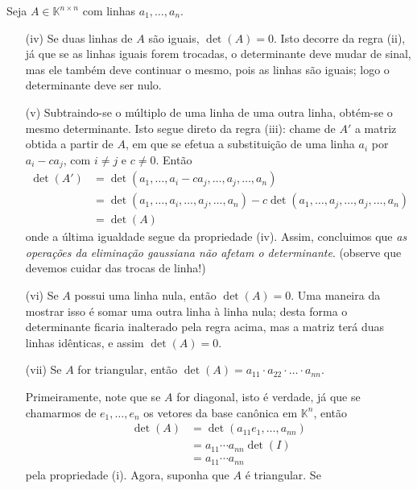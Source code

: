 Seja $A \in {\mathbb{K}}^{n\times n}$ com linhas $a_1,\ldots,a_n$.

\begin{itemize}
\item[(iv)] Se duas linhas de $A$ são iguais, $\det(A) = 0$.
Isto decorre da regra (ii), já que se as linhas iguais forem trocadas, o determinante deve mudar de sinal, mas ele também deve continuar o mesmo, pois as linhas são iguais; logo o determinante deve ser nulo.

\item[(v)] Subtraindo-se o múltiplo de uma linha de uma outra linha, obtém-se o mesmo determinante. Isto segue direto da regra (iii): chame de $A'$ a matriz obtida a partir de $A$, em que se efetua a substituição de uma linha $a_i$ por $a_i-ca_j$, com $i\ne j$ e $c\ne 0$. Então
\begin{align*}
	\det(A')&=\det(a_1,\ldots,a_i-ca_j,\ldots,a_j,\ldots,a_n)\\
    &=\det(a_1,\ldots,a_i,\ldots,a_j,\ldots,a_n)-c\det(a_1,\ldots,a_j,\ldots,a_j,\ldots,a_n)\\
    &=\det(A)
\end{align*}
onde a última igualdade segue da propriedade (iv). Assim, concluimos que \emph{as operações da eliminação gaussiana não afetam o determinante}. (observe que devemos cuidar das trocas de linha!)

\item[(vi)] Se $A$ possui uma linha nula, então $\det(A)=0$.
Uma maneira da mostrar isso é somar uma outra linha à linha nula; desta forma o determinante ficaria inalterado pela regra acima, mas a matriz terá duas linhas idênticas, e assim $\det(A)=0$.

\item[(vii)] Se $A$ for triangular, então $\det(A)=a_{11}\cdot a_{22} \cdot \ldots \cdot a_{nn}$. 

Primeiramente, note que se $A$ for diagonal, isto é verdade, já que se chamarmos de $e_1,\ldots,e_n$ os vetores da base canônica em ${\mathbb{K}}^n$, então
\begin{align*}
	\det(A) &= \det(a_{11}e_1,\ldots,a_{nn})\\
    &= a_{11}\cdots a_{nn}\det(I)\\
    &= a_{11}\cdots a_{nn}
\end{align*}
pela propriedade (i). Agora, suponha que $A$ é triangular. Se 


\end{itemize}

